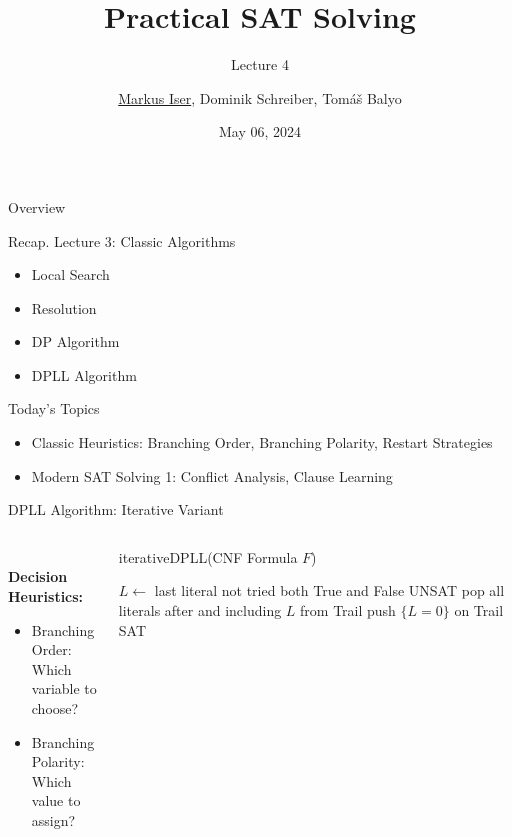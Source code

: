 \documentclass[t]{sdqbeamer}
\title[SAT Solving]{Practical SAT Solving}
\subtitle{Lecture 4}
\author{\underline{Markus Iser}, Dominik Schreiber, Tom\'a\v{s} Balyo}
\date{May 06, 2024}
\begin{document}
\begin{frame}
	\thispagestyle{empty}
	\titlepage
\end{frame}

\begin{frame}{Overview}
	\begin{block}{Recap. Lecture 3: Classic Algorithms}
		\begin{itemize}\setlength{\itemsep}{1ex}
			\item Local Search
			\item Resolution
			\item DP Algorithm
			\item DPLL Algorithm
		\end{itemize}
	\end{block}
	\pause
	\begin{block}{Today's Topics}
		\begin{itemize}\setlength{\itemsep}{1ex}
			\item Classic Heuristics: Branching Order, Branching Polarity, Restart Strategies
			\item Modern SAT Solving 1: Conflict Analysis, Clause Learning
		\end{itemize}
	\end{block}
\end{frame}

\begin{frame}{DPLL Algorithm: Iterative Variant}\begin{block}{}
\begin{columns}[T]
\begin{column}{.3\linewidth}
~\\[1em]
\textbf{Decision Heuristics:}~\\[1em]
\begin{itemize}\setlength{\itemsep}{1em}
	\item Branching Order:\\[1ex] Which variable to choose?
	\item Branching Polarity:\\[1ex] Which value to assign?
\end{itemize}
\end{column}
\begin{column}{.6\linewidth}
\begin{algorithm}[H]
\DontPrintSemicolon
\caption{iterativeDPLL(CNF Formula $F$)}
\BlankLine

 {
	 {
		$L \leftarrow$ last literal not tried both True and False\;
		 {\Return UNSAT}
		pop all literals after and including $L$ from Trail\;
		push $\{ L = 0 \}$ on Trail\;
	}
}
\Return SAT\;
\end{algorithm}
\end{column}
\end{columns}
\end{block}
\end{frame}
\end{document}
